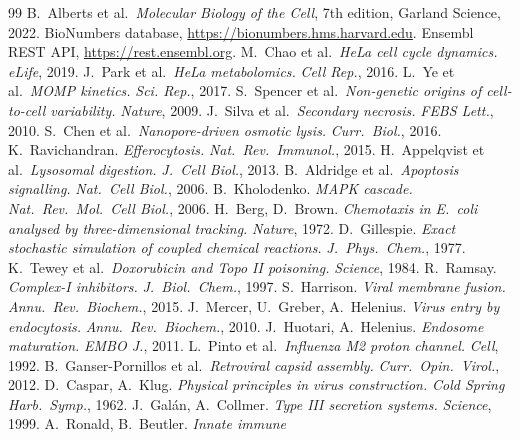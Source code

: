\documentclass[11pt,letterpaper,twoside,openany]{book}
\begin{document}
\begin{thebibliography}{99}
 B.\ Alberts et al.\ \emph{Molecular Biology of the Cell},
  7th edition, Garland Science, 2022.
 BioNumbers database, \url{https://bionumbers.hms.harvard.edu}.
 Ensembl REST API, \url{https://rest.ensembl.org}.
 M.~Chao et al.\ \emph{HeLa cell cycle dynamics.}
  \emph{eLife}, 2019.
 J.~Park et al.\ \emph{HeLa metabolomics.}
  \emph{Cell Rep.}, 2016.
 L.~Ye et al.\ \emph{MOMP kinetics.}
  \emph{Sci. Rep.}, 2017.
 S.~Spencer et al.\ \emph{Non-genetic origins of
  cell-to-cell variability.} \emph{Nature}, 2009.
 J.~Silva et al.\ \emph{Secondary necrosis.}
  \emph{FEBS Lett.}, 2010.
 S.~Chen et al.\ \emph{Nanopore-driven osmotic lysis.}
  \emph{Curr.\ Biol.}, 2016.
 K.~Ravichandran. \emph{Efferocytosis.}
  \emph{Nat.\ Rev.\ Immunol.}, 2015.
 H.~Appelqvist et al.\ \emph{Lysosomal digestion.}
  \emph{J.\ Cell Biol.}, 2013.
 B.~Aldridge et al.\ \emph{Apoptosis signalling.}
  \emph{Nat.\ Cell Biol.}, 2006.
 B.~Kholodenko. \emph{MAPK cascade.}
  \emph{Nat.\ Rev.\ Mol.\ Cell Biol.}, 2006.
 H.~Berg, D.~Brown. \emph{Chemotaxis in \emph{E.\ coli}
  analysed by three-dimensional tracking.} \emph{Nature}, 1972.
 D.~Gillespie. \emph{Exact stochastic simulation
  of coupled chemical reactions.} \emph{J.\ Phys.\ Chem.}, 1977.
 K.~Tewey et al.\ \emph{Doxorubicin and Topo II
  poisoning.} \emph{Science}, 1984.
 R.~Ramsay. \emph{Complex-I inhibitors.}
  \emph{J.\ Biol.\ Chem.}, 1997.
 S.~Harrison. \emph{Viral membrane fusion.}
  \emph{Annu.\ Rev.\ Biochem.}, 2015.
 J.~Mercer, U.~Greber, A.~Helenius. \emph{Virus entry
  by endocytosis.} \emph{Annu.\ Rev.\ Biochem.}, 2010.
 J.~Huotari, A.~Helenius. \emph{Endosome maturation.}
  \emph{EMBO J.}, 2011.
 L.~Pinto et al.\ \emph{Influenza M2 proton channel.}
  \emph{Cell}, 1992.
 B.~Ganser-Pornillos et al.\ \emph{Retroviral capsid
  assembly.} \emph{Curr.\ Opin.\ Virol.}, 2012.
 D.~Caspar, A.~Klug. \emph{Physical principles in
  virus construction.} \emph{Cold Spring Harb.\ Symp.}, 1962.
 J.~Gal{\'a}n, A.~Collmer. \emph{Type III secretion
  systems.} \emph{Science}, 1999.
 A.~Ronald, B.~Beutler. \emph{Innate immune
}
\end{thebibliography}
\end{document}
